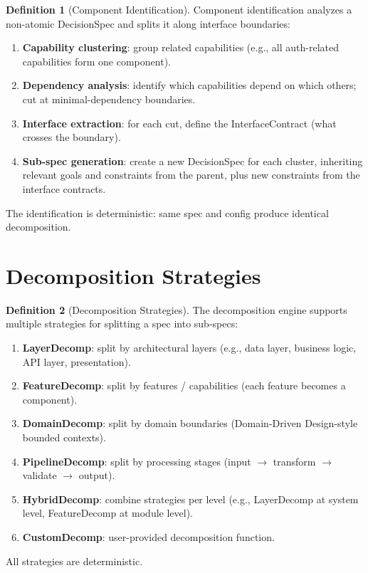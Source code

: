 \documentclass[11pt,a4paper,twoside]{article}
\theoremstyle{definition}
\newtheorem{definition}{Definition}[section]
\theoremstyle{plain}
\theoremstyle{remark}
\begin{document}
\begin{definition}[Component Identification]\label{def:compident}
Component identification analyzes a non-atomic DecisionSpec and splits
it along interface boundaries:
\begin{enumerate}[nosep,label=(\roman*)]
  \item \textbf{Capability clustering}: group related capabilities
        (e.g., all auth-related capabilities form one component).
  \item \textbf{Dependency analysis}: identify which capabilities
        depend on which others; cut at minimal-dependency boundaries.
  \item \textbf{Interface extraction}: for each cut, define the
        InterfaceContract (what crosses the boundary).
  \item \textbf{Sub-spec generation}: create a new DecisionSpec for
        each cluster, inheriting relevant goals and constraints from
        the parent, plus new constraints from the interface contracts.
\end{enumerate}
The identification is deterministic: same spec and config produce
identical decomposition.
\end{definition}


\section{Decomposition Strategies}\label{sec:decompstrat}

\begin{definition}[Decomposition Strategies]\label{def:strategies}
The decomposition engine supports multiple strategies for splitting
a spec into sub-specs:
\begin{enumerate}[nosep,label=(\roman*)]
  \item \textbf{LayerDecomp}: split by architectural layers
        (e.g., data layer, business logic, API layer, presentation).
  \item \textbf{FeatureDecomp}: split by features / capabilities
        (each feature becomes a component).
  \item \textbf{DomainDecomp}: split by domain boundaries
        (Domain-Driven Design-style bounded contexts).
  \item \textbf{PipelineDecomp}: split by processing stages
        (input $\to$ transform $\to$ validate $\to$ output).
  \item \textbf{HybridDecomp}: combine strategies per level
        (e.g., LayerDecomp at system level, FeatureDecomp at module
        level).
  \item \textbf{CustomDecomp}: user-provided decomposition function.
\end{enumerate}
All strategies are deterministic.
\end{definition}
\end{document}
